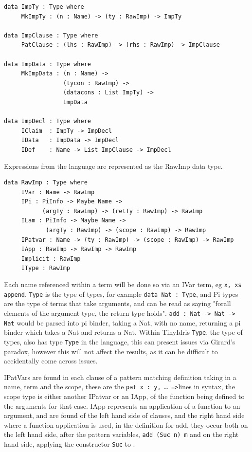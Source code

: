 \documentclass[a4paper]{article}
\begin{document}
\begin{center}
\begin{verbatim}
data ImpTy : Type where
	 MkImpTy : (n : Name) -> (ty : RawImp) -> ImpTy

data ImpClause : Type where
	 PatClause : (lhs : RawImp) -> (rhs : RawImp) -> ImpClause

data ImpData : Type where
	 MkImpData : (n : Name) -> 
				 (tycon : RawImp) ->
				 (datacons : List ImpTy) ->
				 ImpData

data ImpDecl : Type where
	 IClaim  : ImpTy -> ImpDecl
	 IData   : ImpData -> ImpDecl
	 IDef    : Name -> List ImpClause -> ImpDecl
\end{verbatim}
\end{center}

Expressions from the language are represented as the RawImp data type.

\begin{center}
\begin{verbatim}
data RawImp : Type where
	 IVar : Name -> RawImp
	 IPi : PiInfo -> Maybe Name ->
		   (argTy : RawImp) -> (retTy : RawImp) -> RawImp
	 ILam : PiInfo -> Maybe Name ->
			(argTy : RawImp) -> (scope : RawImp) -> RawImp
	 IPatvar : Name -> (ty : RawImp) -> (scope : RawImp) -> RawImp
	 IApp : RawImp -> RawImp -> RawImp
	 Implicit : RawImp
	 IType : RawImp
\end{verbatim}
\end{center}


Each name referenced within a term will be done so via an IVar term, eg
\texttt{x, xs append}. \texttt{Type} is the type of types, for example
\texttt{data Nat : Type}, and Pi types are the type
of terms that take arguments, and can be read as saying "forall elements
of the argument type, the return type holds". \texttt{add : Nat -> Nat -> Nat} would be parsed into pi binder, taking a Nat, with no name, returning a pi binder which takes a Nat and returns a Nat. Within TinyIdris \texttt{Type}, the type of types,
also has type \texttt{Type} in the language, this can present issues via 
Girard's paradox, however this will not affect the results, as it can
be difficult to accidentally come across issues.  

IPatVars are found in each clause of a pattern matching definition 
taking in a name, term and the scope, these are the 
\texttt{pat x : y, \ldots{} =>}lines in syntax, the scope type is either another
IPatvar or an IApp, of the function being defined to the arguments for that case.
IApp represents an application of a function to an argument, and are 
found of the left hand side of clauses, and the right hand side where 
a function application is used, in the definition for add, they occur
both on the left hand side, after the pattern variables, \texttt{add (Suc n) m} and on the right hand side, applying the constructor \texttt{Suc} to . 
\end{document}
